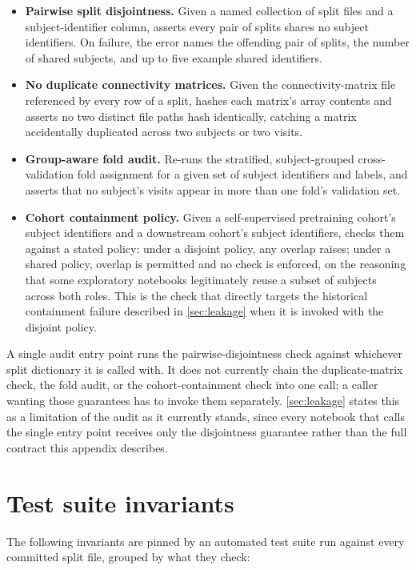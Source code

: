 \begin{itemize}
  \item \textbf{Pairwise split disjointness.} Given a named collection of split files and a
  subject-identifier column, asserts every pair of splits shares no subject identifiers.
  On failure, the error names the offending pair of splits, the number of shared subjects,
  and up to five example shared identifiers.
  \item \textbf{No duplicate connectivity matrices.} Given the connectivity-matrix file
  referenced by every row of a split, hashes each matrix's array contents and asserts no
  two distinct file paths hash identically, catching a matrix accidentally duplicated
  across two subjects or two visits.
  \item \textbf{Group-aware fold audit.} Re-runs the stratified, subject-grouped
  cross-validation fold assignment for a given set of subject identifiers and labels, and
  asserts that no subject's visits appear in more than one fold's validation set.
  \item \textbf{Cohort containment policy.} Given a self-supervised pretraining cohort's
  subject identifiers and a downstream cohort's subject identifiers, checks them against a
  stated policy: under a disjoint policy, any overlap raises; under a shared policy, overlap
  is permitted and no check is enforced, on the reasoning that some exploratory notebooks
  legitimately reuse a subset of subjects across both roles. This is the check that directly
  targets the historical containment failure described in \autoref{sec:leakage} when it is
  invoked with the disjoint policy.
\end{itemize}

A single audit entry point runs the pairwise-disjointness check against whichever split
dictionary it is called with. It does not currently chain the duplicate-matrix check, the
fold audit, or the cohort-containment check into one call; a caller wanting those
guarantees has to invoke them separately. \autoref{sec:leakage} states this as a limitation
of the audit as it currently stands, since every notebook that calls the single entry point
receives only the disjointness guarantee rather than the full contract this appendix
describes.

\section*{Test suite invariants}

The following invariants are pinned by an automated test suite run against every committed
split file, grouped by what they check:

